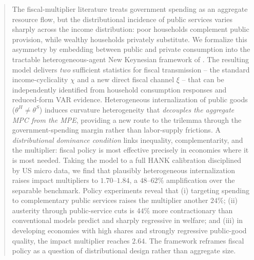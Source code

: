 \begin{abstract}
\noindent
The fiscal-multiplier literature treats government spending as an aggregate
resource flow, but the distributional incidence of public services varies
sharply across the income distribution: poor households complement public
provision, while wealthy households privately substitute. We formalize this
asymmetry by embedding \EC{} between public and private consumption into the
tractable heterogeneous-agent New Keynesian framework of \bilbiie{}. The
resulting model delivers \emph{two} sufficient statistics for fiscal
transmission -- the standard income-cyclicality $\chi$ and a new direct fiscal
channel $\xi$ -- that can be independently identified from household
consumption responses and reduced-form VAR evidence. Heterogeneous
internalization of public goods ($\theta^{H} \neq \theta^{S}$) induces
curvature heterogeneity that \emph{decouples the aggregate MPC from the
MPE}, providing a new route to the \citet{Auclert2024} trilemma through the
government-spending margin rather than labor-supply frictions. A
\emph{distributional dominance condition} links inequality, complementarity,
and the multiplier: fiscal policy is most effective precisely in economies
where it is most needed. Taking the model to a full HANK calibration
disciplined by US micro data, we find that plausibly heterogeneous
internalization raises impact multipliers to $1.70$--$1.84$, a $48$--$62\%$
amplification over the separable benchmark. Policy experiments reveal that
(i) targeting spending to complementary public services raises the multiplier
another $24\%$; (ii) austerity through public-service cuts is $44\%$ more
contractionary than conventional models predict and sharply regressive in
welfare; and (iii) in developing economies with high \HtM{} shares and
strongly regressive public-good quality, the impact multiplier reaches
$2.64$. The framework reframes fiscal policy as a question of
distributional design rather than aggregate size.
\end{abstract}
